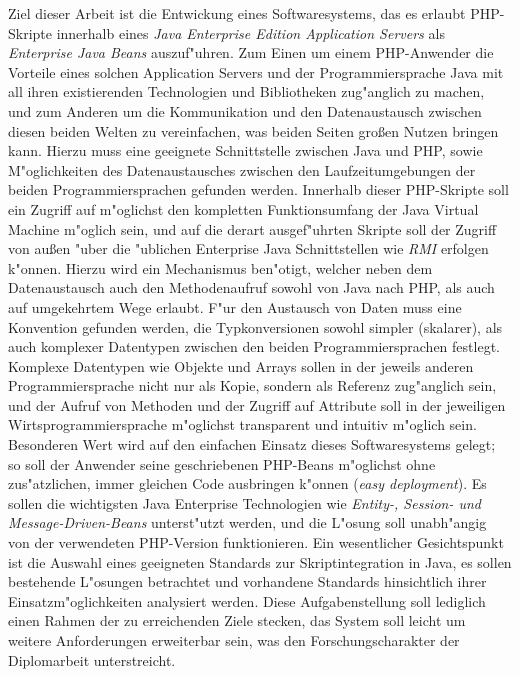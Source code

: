 Ziel dieser Arbeit ist die Entwickung eines Softwaresystems, das es erlaubt PHP-Skripte innerhalb eines 
\emph{Java Enterprise Edition Application Servers} als \emph{Enterprise Java Beans} auszuf"uhren. Zum Einen
um einem PHP-Anwender die Vorteile eines solchen Application Servers und der Programmiersprache Java mit
all ihren existierenden Technologien und Bibliotheken zug"anglich zu machen, und zum Anderen um die
Kommunikation und den Datenaustausch zwischen diesen beiden Welten zu vereinfachen, was beiden Seiten
gro\ss en Nutzen bringen kann.
Hierzu muss eine geeignete Schnittstelle zwischen Java und PHP, sowie M"oglichkeiten des Datenaustausches zwischen
den Laufzeitumgebungen der beiden Programmiersprachen gefunden werden. Innerhalb dieser PHP-Skripte soll ein 
Zugriff auf
m"oglichst den kompletten Funktionsumfang der Java Virtual Machine m"oglich sein, und
auf die derart ausgef"uhrten Skripte soll der Zugriff von au\ss en "uber
die "ublichen Enterprise Java Schnittstellen wie \emph{RMI} erfolgen k"onnen. Hierzu wird ein Mechanismus ben"otigt,
welcher neben dem Datenaustausch auch den Methodenaufruf sowohl von Java nach PHP, als auch auf umgekehrtem Wege 
erlaubt. F"ur den Austausch von Daten muss eine Konvention gefunden werden, die Typkonversionen sowohl simpler (skalarer),
als auch komplexer Datentypen zwischen den beiden Programmiersprachen festlegt. Komplexe Datentypen wie Objekte und
Arrays sollen in der jeweils anderen Programmiersprache nicht nur als Kopie, sondern als Referenz zug"anglich sein,
und der Aufruf von Methoden und der Zugriff auf Attribute soll in der jeweiligen Wirtsprogrammiersprache m"oglichst 
transparent und intuitiv m"oglich sein.
Besonderen Wert wird auf den einfachen Einsatz dieses Softwaresystems gelegt; so soll der Anwender
seine geschriebenen PHP-Beans m"oglichst ohne zus"atzlichen, immer gleichen Code ausbringen
k"onnen (\emph{easy deployment}). Es sollen die wichtigsten Java Enterprise Technologien wie
\emph{Entity-, Session- und Message-Driven-Beans} unterst"utzt werden, und die L"osung soll unabh"angig von der
verwendeten PHP-Version funktionieren. Ein wesentlicher Gesichtspunkt ist die Auswahl eines geeigneten Standards
zur Skriptintegration in Java, es sollen bestehende L"osungen betrachtet und vorhandene Standards hinsichtlich ihrer
Einsatzm"oglichkeiten analysiert werden. 
Diese Aufgabenstellung soll lediglich einen Rahmen der zu erreichenden Ziele stecken, das System soll 
leicht um weitere Anforderungen erweiterbar sein, was den Forschungscharakter der Diplomarbeit unterstreicht.


